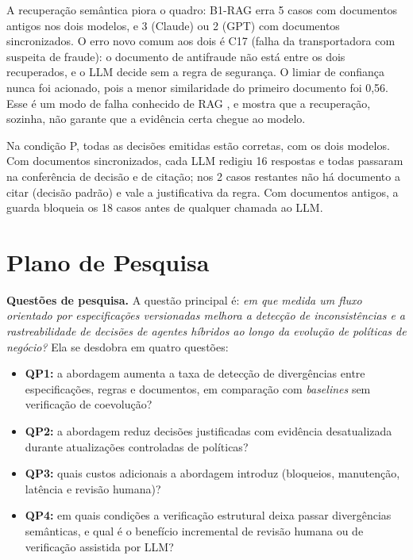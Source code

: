 \documentclass[12pt]{article}
\begin{document}
A recuperação semântica piora o quadro: B1-RAG erra 5 casos com documentos antigos nos dois modelos, e 3 (Claude) ou 2 (GPT) com documentos sincronizados. O erro novo comum aos dois é C17 (falha da transportadora com suspeita de fraude): o documento de antifraude não está entre os dois recuperados, e o LLM decide sem a regra de segurança. O limiar de confiança nunca foi acionado, pois a menor similaridade do primeiro documento foi 0,56. Esse é um modo de falha conhecido de RAG \cite{barnett2024sevenfailure}, e mostra que a recuperação, sozinha, não garante que a evidência certa chegue ao modelo.

Na condição P, todas as decisões emitidas estão corretas, com os dois modelos. Com documentos sincronizados, cada LLM redigiu 16 respostas e todas passaram na conferência de decisão e de citação; nos 2 casos restantes não há documento a citar (decisão padrão) e vale a justificativa da regra. Com documentos antigos, a guarda bloqueia os 18 casos antes de qualquer chamada ao LLM.

\section{Plano de Pesquisa}
\label{sec6:plano}

\textbf{Questões de pesquisa.} A questão principal é: \textit{em que medida um fluxo orientado por especificações versionadas melhora a detecção de inconsistências e a rastreabilidade de decisões de agentes híbridos ao longo da evolução de políticas de negócio?} Ela se desdobra em quatro questões:
\begin{itemize}[noitemsep, topsep=3pt, leftmargin=1.5em]
  \item \textbf{QP1:} a abordagem aumenta a taxa de detecção de divergências entre especificações, regras e documentos, em comparação com \textit{baselines} sem verificação de coevolução?
  \item \textbf{QP2:} a abordagem reduz decisões justificadas com evidência desatualizada durante atualizações controladas de políticas?
  \item \textbf{QP3:} quais custos adicionais a abordagem introduz (bloqueios, manutenção, latência e revisão humana)?
  \item \textbf{QP4:} em quais condições a verificação estrutural deixa passar divergências semânticas, e qual é o benefício incremental de revisão humana ou de verificação assistida por LLM?
\end{itemize}
\end{document}
